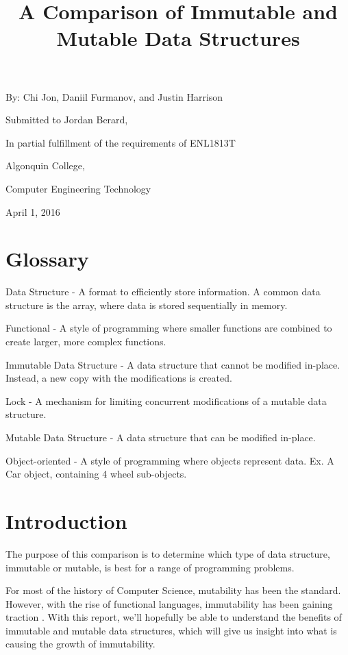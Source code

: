 \documentclass[11pt]{article}
\title{A Comparison of Immutable and Mutable Data Structures}
\author{}
\date{}
\newcommand{\glossaryentry}[2]{#1 - #2}
\begin{document}
\maketitle

\begin{center}
By:  Chi Jon, Daniil Furmanov, and Justin Harrison

\hfill

Submitted to Jordan Berard,

In partial fulfillment of the requirements of ENL1813T

\hfill

Algonquin College,

Computer Engineering Technology

\hfill

April 1, 2016

\clearpage
\end{center}

\section*{Glossary}
\glossaryentry{Data Structure}{
  A format to efficiently store information. A common data
  structure is the array, where data is stored sequentially in memory.
}

\glossaryentry{Functional}{
  A style of programming where smaller functions are combined to create larger,
  more complex functions.
}

\glossaryentry{Immutable Data Structure}{
  A data structure that cannot be modified in-place.
  Instead, a new copy with the modifications is created.
}

\glossaryentry{Lock}{
  A mechanism for limiting concurrent modifications of a mutable data
  structure.
}

\glossaryentry{Mutable Data Structure}{
  A data structure that can be modified in-place.
}

\glossaryentry{Object-oriented}{
  A style of programming where objects represent data. Ex. A Car object,
  containing 4 wheel sub-objects.
}
\clearpage

\section*{Introduction}
The purpose of this comparison is to determine which type of data structure,
immutable or mutable, is best for a range of programming problems.

For most of the history of Computer Science, mutability has been the standard.
However, with the rise of functional languages, immutability has been gaining
traction \cite{ieee_spectrum}. With this report, we'll hopefully be able to
understand the benefits of immutable and mutable data structures, which will
give us insight into what is causing the growth of immutability.
\end{document}
